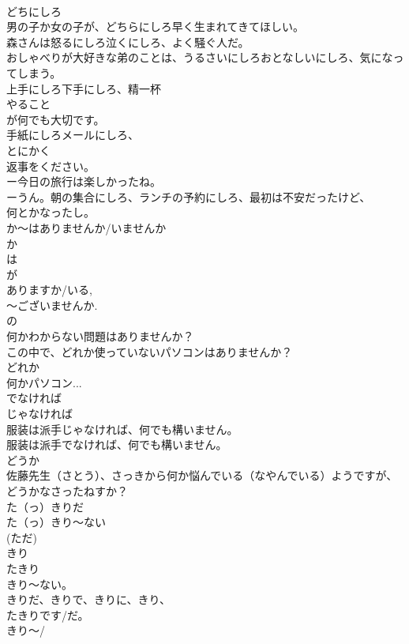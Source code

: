 \documentclass[8pt]{extreport}
\begin{document}
\begin{CJK}{UTF8}{min}
\\	どちにしろ 
\\	男の子か女の子が、どちらにしろ早く生まれてきてほしい。
\\	森さんは怒るにしろ泣くにしろ、よく騒ぐ人だ。
\\	おしゃべりが大好きな弟のことは、うるさいにしろおとなしいにしろ、気になってしまう。
\\	上手にしろ下手にしろ、精一杯
\\	やること
\\	が何でも大切です。
\\	手紙にしろメールにしろ、
\\	とにかく
\\	返事をください。
\\	ー今日の旅行は楽しかったね。
\\	ーうん。朝の集合にしろ、ランチの予約にしろ、最初は不安だったけど、
\\	何とかなったし。
\\	か～はありませんか/いませんか
\\	か 
\\	は 
\\	が
\\	ありますか/いる, 
\\	～ございませんか. 
\\	の
\\	何かわからない問題はありませんか？
\\	この中で、どれか使っていないパソコンはありませんか？
\\	どれか 
\\	何かパソコン...
\\	でなければ
\\	じゃなければ
\\	服装は派手じゃなければ、何でも構いません。
\\	服装は派手でなければ、何でも構いません。
\\	どうか
\\	佐藤先生（さとう）、さっきから何か悩んでいる（なやんでいる）ようですが、どうかなさったねすか？	
\\	た（っ）きりだ
\\	た（っ）きり～ない
\\	(ただ)
\\	きり 
\\	たきり 
\\	きり～ない。
\\	きりだ、きりで、きりに、きり、 
\\	たきりです/だ。　
\\	きり～/

\end{CJK}
\end{document}
